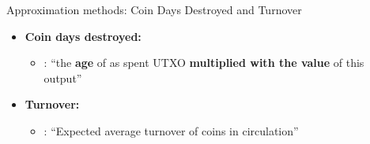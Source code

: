 \documentclass[]{beamer}
\begin{document}
\begin{frame}{Approximation methods: Coin Days Destroyed and Turnover}

  \vfill

  \begin{itemize}
  \item \textbf{Coin days destroyed:}
    \begin{itemize}
    \item {}:  ``the \textbf{age} of as spent UTXO \textbf{multiplied with the value} of this output''
      
    \end{itemize}
    \item \textbf{Turnover:}
    \begin{itemize}
    \item {}: ``Expected average turnover of coins in circulation''      
    \end{itemize}
  \end{itemize}
  \vfill
  


  
\end{frame}
\end{document}
